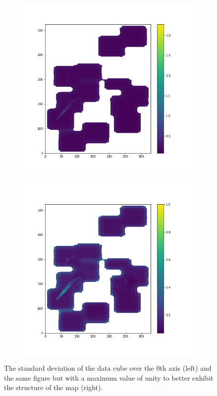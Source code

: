 \documentclass{article}
\begin{document}
\begin{figure}[h]
    \centering
    \captionsetup{justification=centering}
    \begin{subfigure}[H]{0.4\linewidth}
        \includegraphics[width=\linewidth]{Photos/std.png}
    \end{subfigure}
    \begin{subfigure}[H]{0.4\linewidth}
        \includegraphics[width=\linewidth]{Photos/std_capped.png}
    \end{subfigure}
    \captionsetup{justification=centering,margin=1cm}
    \caption{The standard deviation of the data cube over the 0th axis (left) and the same figure but with a maximum value of unity to better exhibit the structure of the map (right).}
    \label{fig:std}
\end{figure}
\end{document}
